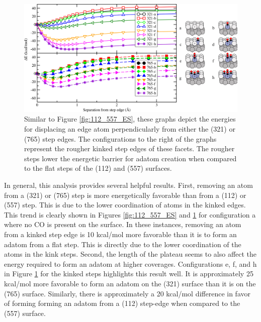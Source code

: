\begin{landscape}
\begin{figure}[p!]
  \centering
  \includegraphics[width=0.9\linewidth]{../figures/chap4/321_765_EnergySeparation_CO.pdf}
  \caption{Similar to Figure \ref{fig:112_557_ES}, these graphs depict the
energies for displacing an edge atom perpendicularly from either the (321) or
(765) step edges. The configurations to the right of the graphs represent the
rougher kinked step edges of these facets. The rougher steps lower the 
energetic barrier for adatom creation when compared to the flat steps of the
(112) and (557) surfaces.}
\label{fig:321_765_ES}
\end{figure}
\end{landscape}

In general, this analysis provides several helpful results. First, removing an
atom from a (321) or (765) step is more energetically favorable than from a
(112) or (557) step. This is due to the lower coordination of atoms in
the kinked edges. This trend is clearly shown in Figures \ref{fig:112_557_ES}
and \ref{fig:321_765_ES} for configuration a where no CO is present on the
surface. In these instances, removing an atom from a kinked step edge is 10
kcal/mol more favorable than it is to form an adatom from a flat step. This is
directly due to the lower coordination of the atoms in the kink steps.
Second, the length of the plateau seems to also affect the energy required to form
an adatom at higher coverages.  Configurations e, f, and h in Figure
\ref{fig:321_765_ES} for the kinked steps highlights this result well. It is
approximately 25 kcal/mol more favorable to form an adatom on the (321) surface
than it is on the (765) surface. Similarly, there is approximately a 20
kcal/mol difference in favor of forming  forming an adatom from a (112) step-edge when
compared to the (557) surface.

